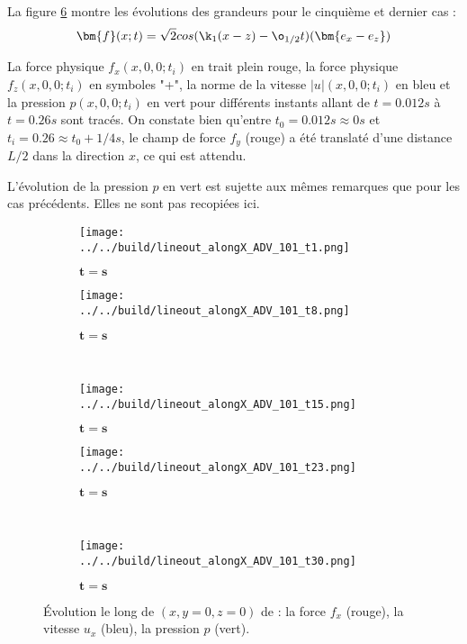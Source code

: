La figure \ref{fig : 101_alongX} montre les évolutions des grandeurs pour le cinquième et dernier cas :
\begin{align}
&\bm{f}(x;t)  = \sqrt{2} cos(\k_1 (x-z) - \o_{1/2} t) (\bm{e_x - e_z}) \\
\end{align} 

La force physique $f_x(x,0,0;t_i)$ en trait plein rouge, la force physique $f_z(x,0,0;t_i)$ en symboles "+", la norme de la vitesse $|u|(x,0,0;t_i)$ en bleu et la pression $p(x,0,0;t_i)$ en vert pour différents instants allant de $t=0.012s$ à $t=0.26s$ sont tracés. On constate bien qu'entre $t_0=0.012s \approx 0s$ et $t_i = 0.26 \approx t_0 + 1/4 s$, le champ de force $f_y$ (rouge) a été translaté d'une distance $L/2$ dans la direction $x$, ce qui est attendu. 

L'évolution de la pression $p$ en vert est sujette aux mêmes remarques que pour les cas précédents. Elles ne sont pas recopiées ici.


\begin{figure}
\begin{center}
	\begin{subfigure}[t]{0.4\textwidth}                                                                                                                                   
		\texttt{[image: ../../build/lineout\_alongX\_ADV\_101\_t1.png]}
		\caption{ $\bm{t=s}$}
		\label{fig : 101_t1}
	\end{subfigure}\hfill
	\begin{subfigure}[t]{0.4\textwidth}
		\texttt{[image: ../../build/lineout\_alongX\_ADV\_101\_t8.png]}
		\caption{ $\bm{t=s}$}
		\label{fig : 101_t6}
	\end{subfigure}
\\
	\begin{subfigure}[t]{0.4\textwidth}
		\texttt{[image: ../../build/lineout\_alongX\_ADV\_101\_t15.png]}
		\caption{ $\bm{t=s}$}
		\label{fig : 101_t11}
	\end{subfigure}\hfill
	\begin{subfigure}[t]{0.4\textwidth}
		\texttt{[image: ../../build/lineout\_alongX\_ADV\_101\_t23.png]}
		\caption{ $\bm{t=s}$}
		\label{fig : 101_t16}
	\end{subfigure}
\\
	\begin{subfigure}[t]{0.4\textwidth}
		\texttt{[image: ../../build/lineout\_alongX\_ADV\_101\_t30.png]}
		\caption{ $\bm{t=s}$}
		\label{fig : 101_t21}
	\end{subfigure}	
\end{center}
\caption{Évolution le long de $(x,y=0,z=0)$ de : la force $f_x$ (rouge), la vitesse $u_x$ (bleu), la pression $p$ (vert).}
\label{fig : 101_alongX}
\end{figure}


